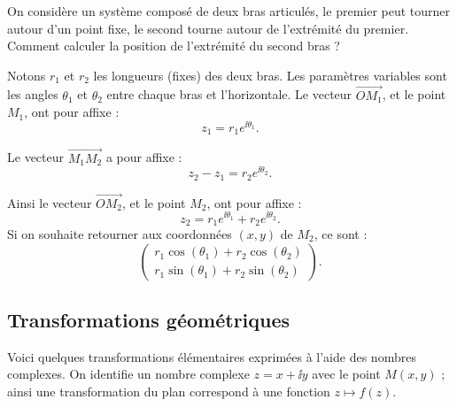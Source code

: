 \documentclass[11pt,class=report,crop=false]{standalone}
\begin{document}
\begin{exemple}
On considère un système composé de deux bras articulés, le premier peut tourner autour d'un point fixe, le second tourne autour de l'extrémité du premier. Comment calculer la position de l'extrémité du second bras ?


Notons $r_1$ et $r_2$ les longueurs (fixes) des deux bras. Les paramètres variables sont les angles $\theta_1$ et $\theta_2$ entre chaque bras et l'horizontale.
Le vecteur $\vec{OM_1}$, et le point $M_1$, ont pour affixe :
$$z_1 = r_1 e^{\ii \theta_1}.$$

Le vecteur $\vec{M_1M_2}$ a pour affixe : 
$$z_2 - z_1 = r_2 e^{\ii \theta_2}.$$

Ainsi le vecteur $\vec{OM_2}$, et le point $M_2$, ont pour affixe :
$$z_2 = r_1 e^{\ii \theta_1} + r_2 e^{\ii \theta_2}.$$
Si on souhaite retourner aux coordonnées $(x,y)$ de $M_2$, ce sont :	
$$\begin{pmatrix}
	r_1\cos(\theta_1) + r_2\cos(\theta_2) \\ 
	r_1\sin(\theta_1) + r_2\sin(\theta_2)
\end{pmatrix}.$$
\end{exemple}


\subsection{Transformations géométriques}

Voici quelques transformations élémentaires exprimées à l'aide des nombres complexes.
On identifie un nombre complexe $z = x + \ii y$ avec le point $M(x,y)$ ; ainsi une transformation du plan correspond à une fonction $z \mapsto f(z)$.
\end{document}
